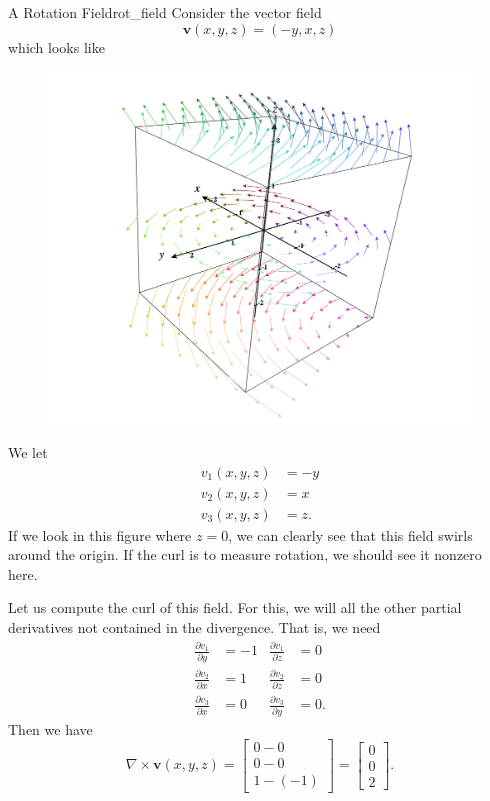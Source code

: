         \begin{ex}{A Rotation Field}{rot_field}
        Consider the vector field
        \[
        \mathbf{v}(x,y,z) = (-y,x,z)
        \]
        which looks like
        \begin{figure}[H]
            \centering
            \includegraphics[width=.6\textwidth]{Figures/curl_field.png}
        \end{figure}
        We let
        \begin{align*}
            v_1(x,y,z) &= -y\\
            v_2(x,y,z) &= x\\
            v_3(x,y,z) &= z.
        \end{align*}
        If we look in this figure where $z=0$, we can clearly see that this field swirls around the origin.  If the curl is to measure rotation, we should see it nonzero here.
        
        Let us compute the curl of this field.  For this, we will all the other partial derivatives not contained in the divergence. That is, we need
        \begin{align*}
            \frac{\partial v_1}{\partial y} &= -1 & \frac{\partial v_1}{\partial z} &= 0\\
            \frac{\partial v_2}{\partial x} &= 1& \frac{\partial v_2}{\partial z} &= 0\\
            \frac{\partial v_3}{\partial x} &= 0 &  \frac{\partial v_3}{\partial y} &=0.
        \end{align*}
        Then we have
        \[
        \nabla \times \mathbf{v}(x,y,z) = \begin{bmatrix} 0-0\\ 0-0 \\ 1-(-1)\end{bmatrix} = \begin{bmatrix} 0\\ 0 \\ 2\end{bmatrix}.
        \]
        

\end{ex}
